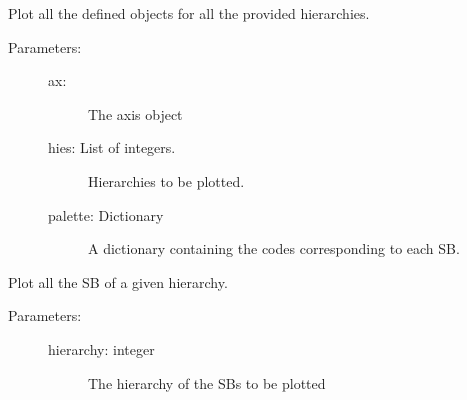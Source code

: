 \documentclass[letterpaper,10pt,english]{sphinxmanual}
\begin{document}

\begin{fulllineitems}
\label{\detokenize{hiegeo:hiegeo.plot_sb_ax}}
Plot all the defined objects for all the provided hierarchies.
\begin{description}
\item[{Parameters:}] \leavevmode\begin{description}
\item[{ax:}] \leavevmode
The axis object

\item[{hies: List of integers.}] \leavevmode
Hierarchies to be plotted.

\item[{palette: Dictionary}] \leavevmode
A dictionary containing the codes corresponding to each SB.

\end{description}

\end{description}

\end{fulllineitems}


\begin{fulllineitems}
\label{\detokenize{hiegeo:hiegeo.plot_sb_by_hie}}
Plot all the SB of a given hierarchy.
\begin{description}
\item[{Parameters:}] \leavevmode\begin{description}
\item[{hierarchy: integer}] \leavevmode
The hierarchy of the SBs to be plotted

\end{description}

\end{description}

\end{fulllineitems}

\end{document}
